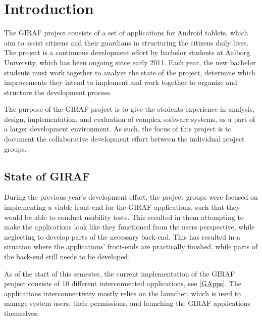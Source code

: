 \chapter{Introduction}
The GIRAF project consists of a set of applications for Android
tablets, which aim to assist citizens and their guardians in 
structuring the citizens daily lives. The project is a continuous development
effort by bachelor students at Aalborg University, which has been
ongoing since early 2011. Each year, the new bachelor students must work
together to analyze the state of the project, determine which improvements
they intend to implement and work together to organize and structure the
development process.\nl

The purpose of the GIRAF project is to give the students experience in analysis,
design, implementation, and evaluation of complex software systems, as a part of
a larger development environment. As such, the focus of this project is to
document the collaborative development effort between the individual project
groups.


\section{State of GIRAF}
During the previous year's development effort, the project groups were focused
on implementing a viable front-end for the GIRAF applications, such that they
would be able to conduct usability tests. This resulted in them
attempting to make the applications look like they functioned from the users
perspective, while neglecting to develop parts of the necessary back-end.
This has resulted in a situation where the applications' front-ends are
practically finished, while parts of the back-end still needs to be
developed.\nl

As of the start of this semester, the current implementation of the GIRAF
project consists of 10 different interconnected applications, see
\autoref{GApps}. The applications interconnectivity mostly relies on the
launcher, which is used to manage system users, their permissions, and
launching the GIRAF applications themselves.

